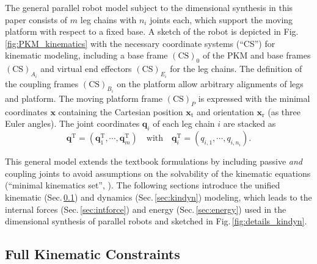 \documentclass[fleqn,a4paper,10pt]{article}
\newcommand{\bm}[1]{\mathbf{#1}}
\renewcommand{\Phi}[1]{\varPhi{#1}}
\newcommand{\transp}[0]{{\mathrm{T}}}
\newcommand{\ks}[1]{{(\mathrm{CS})}_{#1}}
\renewenvironment{figure}
  {\par\vspace{6pt}\noindent\minipage{\linewidth}}
  {\endminipage\par\vspace{6pt}}
\begin{document}
\begin{multicols}{2}
The general parallel robot model subject to the dimensional synthesis in this paper consists of $m$ leg chains with $n_i$ joints each, which support the moving platform with respect to a fixed base.
A sketch of the robot is depicted in Fig.\,\ref{fig:PKM_kinematics} with the necessary coordinate systems (``CS'') for kinematic modeling, including a base frame $\ks{0}$ of the PKM and base frames $\ks{A_i}$ and virtual end effectors $\ks{E_i}$ for the leg chains.
The definition of the coupling frames $\ks{B_i}$ on the platform allow arbitrary alignments of legs and platform.
The moving platform frame $\ks{P}$ is expressed with the minimal coordinates $\bm{x}$ containing the Cartesian position $\bm{x}_\mathrm{t}$ and orientation  $\bm{x}_\mathrm{r}$ (as three Euler angles).
The joint coordinates $\bm{q}_i$ of each leg chain $i$ are stacked as
%
\begin{equation}
\bm{q}^\transp=(\bm{q}_{1}^\transp,\cdots,\bm{q}_{m}^\transp) \quad \mathrm{with}  \quad \bm{q}_i^\transp=(q_{i,1},\cdots,q_{i,n_i}).
\end{equation}

\begin{figure}
    \graphicspath{{./Bilder/}}
    \centering
    \vspace{-0.2cm}
    
    \vspace{-0.4cm} %
    \label{fig:PKM_kinematics}
\end{figure}


This general model extends the textbook formulations \cite{Merlet2006,BriotKha2015} by including passive \emph{and} coupling joints to avoid assumptions on the solvability of the kinematic equations (``minimal kinematics set'', \cite{Merlet2006}).
The following sections introduce the unified kinematic (Sec.\,\ref{sec:kinematics}) and dynamics (Sec.\,\ref{sec:kindyn}) modeling, which leads to the internal forces (Sec.\,\ref{sec:intforce}) and energy (Sec.\,\ref{sec:energy}) used in the dimensional synthesis of parallel robots and sketched in Fig.\,\ref{fig:details_kindyn}.



\subsection{Full Kinematic Constraints}
\label{sec:kinematics}



\end{multicols}
\end{document}

